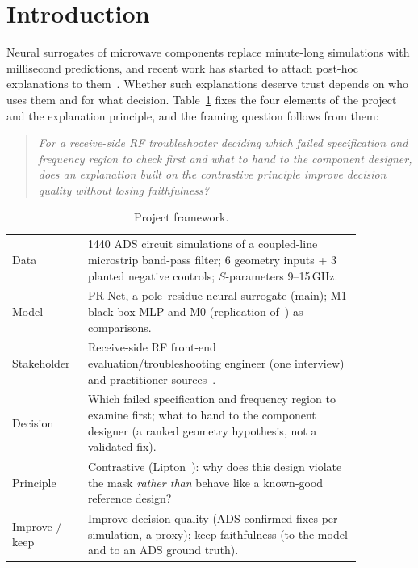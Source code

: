 \documentclass[conference,onecolumn,10pt]{IEEEtran}
\begin{document}
\section{Introduction}
Neural surrogates of microwave components replace minute-long simulations with millisecond predictions, and recent work has started to attach post-hoc explanations to them~\cite{suslova2026}.
Whether such explanations deserve trust depends on who uses them and for what decision.
Table~\ref{tab:frame} fixes the four elements of the project and the explanation principle, and the framing question follows from them:

\begin{quote}
\emph{For a receive-side RF troubleshooter deciding which failed specification and frequency region to check first and what to hand to the component designer, does an explanation built on the contrastive principle improve decision quality without losing faithfulness?}
\end{quote}

\begin{table}[htbp]
\centering
\caption{Project framework.}
\label{tab:frame}
\small
\begin{tabular}{p{0.16\linewidth}p{0.70\linewidth}}
\toprule
Data & 1440 ADS circuit simulations of a coupled-line microstrip band-pass filter; 6 geometry inputs + 3 planted negative controls; $S$-parameters 9--15\,GHz. \\
Model & PR-Net, a pole--residue neural surrogate (main); M1 black-box MLP and M0 (replication of~\cite{suslova2026}) as comparisons. \\
Stakeholder & Receive-side RF front-end evaluation/troubleshooting engineer (one interview) and practitioner sources~\cite{rs_evm,adi_an1354}. \\
Decision & Which failed specification and frequency region to examine first; what to hand to the component designer (a ranked geometry hypothesis, not a validated fix). \\
Principle & Contrastive (Lipton~\cite{lipton1990}): why does this design violate the mask \emph{rather than} behave like a known-good reference design? \\
Improve / keep & Improve decision quality (ADS-confirmed fixes per simulation, a proxy); keep faithfulness (to the model and to an ADS ground truth). \\
\bottomrule
\end{tabular}
\end{table}
\end{document}
